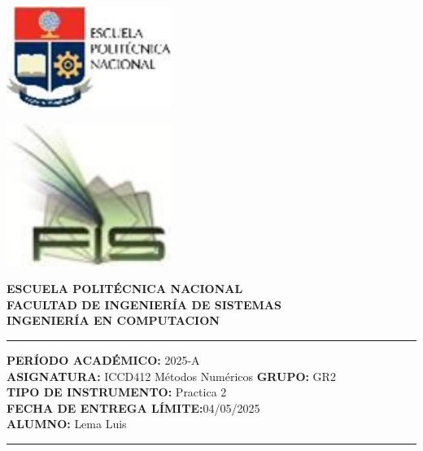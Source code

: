 \documentclass[12pt]{article}
\begin{document}
\begin{minipage}{0.45\textwidth}
    \includegraphics[width=0.4\textwidth]{inFiles/Figures/epnLogo.jpg}
\end{minipage}
\hfill
\begin{minipage}{0.45\textwidth}
    \raggedleft
    \includegraphics[width=0.4\textwidth]{inFiles/Figures/FIS_logo.jpg}
\end{minipage}

\vspace{0.5cm}

\begin{center}
    \textbf{ESCUELA POLITÉCNICA NACIONAL}\\[0.2cm]
    \textbf{FACULTAD DE INGENIERÍA DE SISTEMAS}\\[0.2cm]
    \textbf{INGENIERÍA {\textbf{EN COMPUTACION}}}
\end{center}

\vspace{0.5cm}
\hrule
\vspace{0.5cm}

\noindent\textbf{PERÍODO ACADÉMICO:} 2025-A\\[0.2cm]
\noindent\textbf{ASIGNATURA:} ICCD412 Métodos Numéricos \hfill \textbf{GRUPO:} GR2\\[0.2cm]
\noindent\textbf{TIPO DE INSTRUMENTO:} {Practica 2}\\[0.2cm]
\noindent\textbf{FECHA DE ENTREGA LÍMITE:}{04/05/2025}\\[0.2cm]
\noindent\textbf{ALUMNO:} {Lema Luis}

\vspace{0.5cm}
\hrule
\vspace{1cm}
\end{document}
